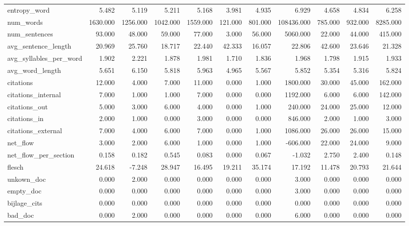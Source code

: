\begin{tabular}{lrrrrrrrrrr}
\cline{1-11}
entropy\_word & 5.482 & 5.119 & 5.211 & 5.168 & 3.981 & 4.935 & 6.929 & 4.658 & 4.834 & 6.258 \\
\cline{1-11}
num\_words & 1630.000 & 1256.000 & 1042.000 & 1559.000 & 121.000 & 801.000 & 108436.000 & 785.000 & 932.000 & 8285.000 \\
\cline{1-11}
num\_sentences & 93.000 & 48.000 & 59.000 & 77.000 & 3.000 & 56.000 & 5060.000 & 22.000 & 44.000 & 415.000 \\
\cline{1-11}
avg\_sentence\_length & 20.969 & 25.760 & 18.717 & 22.440 & 42.333 & 16.057 & 22.806 & 42.600 & 23.646 & 21.328 \\
\cline{1-11}
avg\_syllables\_per\_word & 1.902 & 2.221 & 1.878 & 1.981 & 1.710 & 1.836 & 1.968 & 1.798 & 1.915 & 1.933 \\
\cline{1-11}
avg\_word\_length & 5.651 & 6.150 & 5.818 & 5.963 & 4.965 & 5.567 & 5.852 & 5.354 & 5.316 & 5.824 \\
\cline{1-11}
citations & 12.000 & 4.000 & 7.000 & 11.000 & 0.000 & 1.000 & 1800.000 & 30.000 & 45.000 & 162.000 \\
\cline{1-11}
citations\_internal & 7.000 & 1.000 & 1.000 & 7.000 & 0.000 & 0.000 & 1192.000 & 6.000 & 6.000 & 142.000 \\
\cline{1-11}
citations\_out & 5.000 & 3.000 & 6.000 & 4.000 & 0.000 & 1.000 & 240.000 & 24.000 & 25.000 & 12.000 \\
\cline{1-11}
citations\_in & 2.000 & 1.000 & 0.000 & 3.000 & 0.000 & 0.000 & 846.000 & 2.000 & 1.000 & 3.000 \\
\cline{1-11}
citations\_external & 7.000 & 4.000 & 6.000 & 7.000 & 0.000 & 1.000 & 1086.000 & 26.000 & 26.000 & 15.000 \\
\cline{1-11}
net\_flow & 3.000 & 2.000 & 6.000 & 1.000 & 0.000 & 1.000 & -606.000 & 22.000 & 24.000 & 9.000 \\
\cline{1-11}
net\_flow\_per\_section & 0.158 & 0.182 & 0.545 & 0.083 & 0.000 & 0.067 & -1.032 & 2.750 & 2.400 & 0.148 \\
\cline{1-11}
flesch & 24.618 & -7.248 & 28.947 & 16.495 & 19.211 & 35.174 & 17.192 & 11.478 & 20.793 & 21.644 \\
\cline{1-11}
unkown\_doc & 0.000 & 2.000 & 0.000 & 0.000 & 0.000 & 0.000 & 3.000 & 0.000 & 0.000 & 0.000 \\
\cline{1-11}
empty\_doc & 0.000 & 0.000 & 0.000 & 0.000 & 0.000 & 0.000 & 3.000 & 0.000 & 0.000 & 0.000 \\
\cline{1-11}
bijlage\_cits & 0.000 & 0.000 & 0.000 & 0.000 & 0.000 & 0.000 & 0.000 & 0.000 & 0.000 & 0.000 \\
\cline{1-11}
bad\_doc & 0.000 & 2.000 & 0.000 & 0.000 & 0.000 & 0.000 & 6.000 & 0.000 & 0.000 & 0.000 \\
\cline{1-11}
\bottomrule
\end{tabular}
